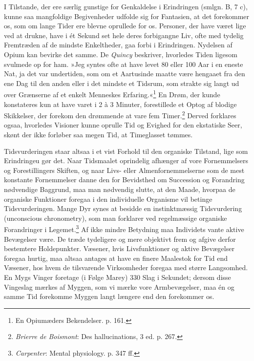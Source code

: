 \documentclass[12pt,a4paper,openany]{book}
\newcommand{\opage}[1]{\marginnote{\footnotesize\textit{[#1]}}}
\begin{document}
I Tilstande, der ere særlig gunstige for Genkaldelse i Erindringen
(smlgn. B, 7 c), kunne saa mangfoldige Begivenheder udfolde sig for
Fantasien, at det forekommer os, som om lange Tider ere blevne oprullede
for os. Personer, der have været lige ved at drukne, have i ét Sekund
set hele deres forbigangne Liv, ofte med tydelig Fremtræden af de
mindste Enkeltheder, gaa forbi i Erindringen. Nydelsen af Opium kan
bevirke det samme. De \emph{Quincy} beskriver, hvorledes Tiden ligesom
svulmede op for ham. »Jeg syntes ofte at have levet 80 eller 100 Aar i
en eneste Nat, ja det var undertiden, som om et Aartusinde maatte være
hengaaet fra den ene Dag til den anden eller i det mindste et Tidsrum,
som strakte sig langt ud over Grænserne af et enkelt Menneskes
Erfaring.«\footnote[2]{En Opiumæders Bekendelser. p. 161.} En Drøm, der
kunde konstateres kun at have varet i 2 à 3 Minuter, forestillede et
Optog af blodige Skikkelser, der forekom den drømmende at vare fem
Timer.\footnote[3]{\emph{Brierre de Boismont}: Des hallucinations, 3 ed.
p. 267.} Derved forklares
\opage{233}ogsaa, hvorledes Visioner kunne oprulle Tid og Evighed for
den ekstatiske Seer, skønt der ikke forløber saa megen Tid, at
Timeglasset tømmes.

Tidsvurderingen staar altsaa i et vist Forhold til den organiske
Tilstand, lige som Erindringeu gør det. Naar Tidsmaalet oprindelig
afhænger af vore Fornemmelsers og Forestillingers Skiften, og naar Livs-
eller Almenfornemmelserne som de mest konstante Fornemmelser danne den
for Bevidsthed om Succession og Forandring nødvendige Baggrund, maa man
nødvendig slutte, at den Maade, hvorpaa de organiske Funktioner foregaa
i den individuelle Organisme vil betinge Tidsvurderingen. Mange Dyr
synes at besidde en instinktmæssig Tidsvurdering (unconscious
chronometry), som man forklarer ved regelmæssige organiske Forandringer
i Legemet.\footnote[1]{\emph{Carpenter}: Mental physiology. p. 347 ff.} Af ikke
mindre Betydning maa Individets vante aktive Bevægelser være. De træde
tydeligere og mere objektivt frem og afgive derfor bestemtere
Holdepunkter. Væsener, hvis Livsfunktioner og aktive Bevægelser foregaa
hurtig, maa altsaa antages at have en finere Maalestok for Tid end
Væsener, hos hvem de tilsvarende Virksomheder foregaa med større
Langsomhed. En Mygs Vinger foretage (i Følge Marey) 330 Slag i
Sekundet; dersom disse Vingeslag mærkes af Myggen, som vi mærke vore
Armbevægelser, maa én og samme Tid forekomme Myggen langt længere end
den forekommer os.
\end{document}
